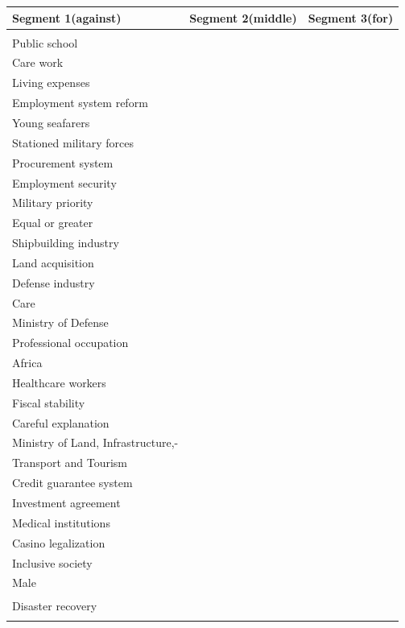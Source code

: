 \documentclass[final,5p,times,twocolumn,authoryear]{elsarticle}
\begin{document}
\begin{table}[htbp]
\centering
\renewcommand{\arraystretch}{1.5}%
\begin{tabularx}{\textwidth}{|>{\centering\arraybackslash}X|>{\centering\arraybackslash}X|>{\centering\arraybackslash}X|}
\hline
\textbf{Segment 1(against)} & \textbf{Segment 2(middle)} & \textbf{Segment 3(for)} \\ \hline
\begin{tabular}[c]{@{}l@{}}
	Public broadcasting \\ Public school \\ Care work \\ Living expenses \\ Employment system reform \\ Young seafarers \\ Stationed military forces \\ Procurement system \\ Employment security \\ Military priority \\ Equal or greater \\ Shipbuilding industry \\ Land acquisition \\ Defense industry \\ Care \\ Ministry of Defense \\ Professional occupation \\ Africa \\ Healthcare workers \\ Fiscal stability \\ Careful explanation \\ Ministry of Land, Infrastructure,-\\ Transport and Tourism \\ Credit guarantee system \\ Investment agreement \\ Medical institutions \\ Casino legalization \\ Inclusive society \\ Male \\ Disaster recovery
\end{tabular} 
& 
\begin{tabular}[c]{@{}l@{}}

\end{tabular}
\end{tabularx}
\end{table}
\end{document}
